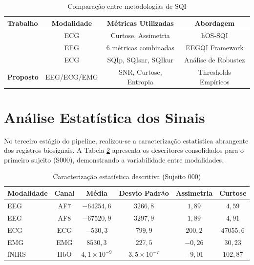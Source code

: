 \begin{table}[htbp]
    \centering
    \caption{Comparação entre metodologias de SQI}
    \label{tab:comparacao_sqi}
    \begin{tabular}{lccc}
        \toprule
        \textbf{Trabalho} & \textbf{Modalidade} & \textbf{Métricas Utilizadas} & \textbf{Abordagem} \\
        \midrule
        \cite{cuena2019tool} & ECG & Curtose, Assimetria & hOS-SQI \\
        \cite{zheng2019eeg} & EEG & 6 métricas combinadas & EEGQI Framework \\
        \cite{taylor2022robustness} & ECG & SQIp, SQIsnr, SQIkur & Análise de Robustez \\
        \textbf{Proposto} & EEG/ECG/EMG & SNR, Curtose, Entropia & Thresholds Empíricos \\
        \bottomrule
    \end{tabular}
\end{table}

\section{Análise Estatística dos Sinais}
\label{sec:resultados_estatistica}

No terceiro estágio do pipeline, realizou-se a caracterização estatística abrangente dos registros biosignais. A Tabela \ref{tab:resumo_estatistico} apresenta os descritores consolidados para o primeiro sujeito (S000), demonstrando a variabilidade entre modalidades.

\begin{table}[htbp]
    \centering
    \caption{Caracterização estatística descritiva (Sujeito 000)}
    \label{tab:resumo_estatistico}
    \begin{tabular}{lccccc}
        \toprule
        \textbf{Modalidade} & \textbf{Canal} & \textbf{Média} & \textbf{Desvio Padrão} & \textbf{Assimetria} & \textbf{Curtose} \\
        \midrule
        EEG & AF7 & $-64254{,}6$ & $3266{,}8$ & $1{,}89$ & $4{,}59$ \\
        EEG & AF8 & $-67520{,}9$ & $3297{,}9$ & $1{,}89$ & $4{,}91$ \\
        ECG & ECG & $-530{,}3$ & $799{,}9$ & $200{,}2$ & $47055{,}6$ \\
        EMG & EMG & $8530{,}3$ & $227{,}5$ & $-0{,}26$ & $30{,}23$ \\
        fNIRS & HbO & $4{,}1 \times 10^{-9}$ & $3{,}5 \times 10^{-7}$ & $-9{,}01$ & $102{,}87$ \\
        \bottomrule
    \end{tabular}
\end{table}

